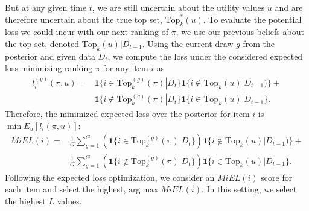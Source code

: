\documentclass[a4paper,11pt]{article}
\newcommand{\topset}{\text{Top}_k}
\begin{document}
%
%


But at any given time $t$, we are still uncertain about the utility values $u$ and are therefore uncertain about the true top set, $\topset^{*}(u)$. To evaluate the potential loss we could incur with our next ranking of $\pi$, we use our previous beliefs about the top set, denoted $\topset(u) | D_{t-1}$. Using the current draw $g$ from the posterior and given data $D_{t}$, we compute the loss under the considered expected loss-minimizing ranking $\pi$ for any item $i$ as  
\begin{align}
l_i^{(g)}(\pi,u) = 
& \mathbf{1}\{ i \in \topset^{(g)}(\pi) | D_{t} \} 
  \mathbf{1}\{ i \notin \topset(u) | D_{t-1} ) \} + \nonumber \\
& \mathbf{1}\{ i \notin \topset^{(g)}(\pi) | D_{t} \} 
  \mathbf{1}\{ i \in \topset(u)| D_{t-1} \}.  
\end{align}
Therefore, the minimized expected loss over the posterior for item $i$ is $\min E_{u}[l_i(\pi,u)]$:
\begin{align}
MiEL(i) =  
& \frac{1}{G} \sum_{g=1}^{G} 
   \left( \mathbf{1}\{ i \in \topset^{(g)}(\pi) | D_{t} \} \right)
  \mathbf{1}\{ i \notin \topset(u) | D_{t-1} ) \} + \nonumber \\ 
& \frac{1}{G} \sum_{g=1}^{G}
   \left( \mathbf{1}\{ i \notin \topset^{(g)}(\pi) | D_{t} \} \right)
  \mathbf{1}\{ i \in \topset(u)| D_{t-1} \}.  
\end{align}
Following the expected loss optimization, we consider an $MiEL(i)$ score for each item and select the highest, $\text{arg}\max MiEL(i)$. In this setting, we select the highest $L$ values.
\end{document}
